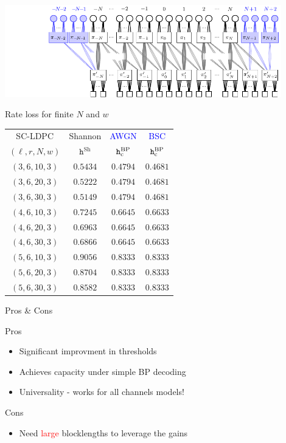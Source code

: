 \documentclass[10pt,presentation]{beamer}
\begin{document}
\begin{frame}
  \includegraphics[width=0.9\textwidth]{./Figures/SC/spatially-coupled-ensemble.pdf}
\end{frame}

\begin{frame}{Rate loss for finite $N$ and $w$}
\centering
\begin{tabular}{|c|c|c|c|}
  \hline
  SC-LDPC & Shannon & \textcolor{blue}{AWGN} & \textcolor{blue}{BSC} \\
  $(\ell,r,N,w)$ & $\texttt{h}^{\mathrm{Sh}}$  & $\texttt{h}^{\mathrm{BP}}_{\mathrm{c}}$ & $\texttt{h}^{\mathrm{BP}}_{\mathrm{c}}$  \\
  \hline
  $(3,6,10,3)$ & $0.5434$ & $0.4794$ & $0.4681$ \\
  $(3,6,20,3)$ & $0.5222$ & $0.4794$ & $0.4681$ \\
  $(3,6,30,3)$ & $0.5149$ & $0.4794$ & $0.4681$ \\
  \hline
  $(4,6,10,3)$ & $0.7245$ & $0.6645$ & $0.6633$ \\
  $(4,6,20,3)$ & $0.6963$ & $0.6645$ & $0.6633$ \\
  $(4,6,30,3)$ & $0.6866$ & $0.6645$ & $0.6633$ \\
  \hline
  $(5,6,10,3)$ & $0.9056$ & $0.8333$ & $0.8333$ \\
  $(5,6,20,3)$ & $0.8704$ & $0.8333$ & $0.8333$ \\
  $(5,6,30,3)$ & $0.8582$ & $0.8333$ & $0.8333$ \\
  \hline
\end{tabular}
\end{frame}

\begin{frame}{Pros \& Cons}
\begin{defn}{Pros}
\begin{itemize}
\item Significant improvment in thresholds
\vspace{0.25cm}
\item Achieves capacity under {\blue simple BP decoding}
\vspace{0.25cm}
\item {\blue Universality} - works for all channels models! 
\vspace{0.25cm}
\end{itemize}
\end{defn}

\begin{defn}{Cons}
\begin{itemize}
\item Need \textcolor{red}{large} blocklengths to leverage the gains
\end{itemize}
\end{defn}
\end{frame}
\end{document}
